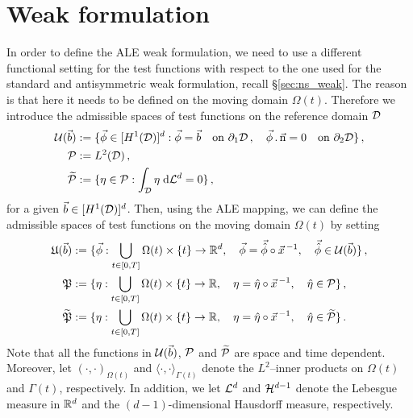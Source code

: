 \section{Weak formulation}\label{sec:ale_weak}
In order to define the ALE weak formulation, we need to use a different
functional setting for the test functions with respect to the one used for the
standard and antisymmetric weak formulation, recall \S\ref{sec:ns_weak}.
The reason is that here it
needs to be defined on the moving domain $\Omega(t)$. Therefore we introduce
the admissible spaces of test functions on the reference domain $\mathcal D$
\begin{align*}
\mathcal{U}(\vec{b}) &:= \{\vec \phi\in[H^1(\mathcal D)]^d:
\vec \phi =\vec b\quad \mbox{on }\partial_1\mathcal D\,,
\quad \vec \phi\,.\,\vec{\rm n}=0 \quad \mbox{on }\partial_2\mathcal D\}\,,\\
\mathcal{P} &:= L^2(\mathcal D)\,,\\
\widetilde{\mathcal{P}} &:= \{\eta\in\mathcal{P} : \int_\mathcal D\eta\;{\rm d}{\cal L}^{d}=0 \}\,,
\end{align*}
for a given $\vec b \in [H^1(\mathcal D)]^d$. Then, using the ALE mapping, we can
define the admissible spaces of test functions on the moving domain $\Omega(t)$
by setting
\begin{align*}
\mathfrak{U}(\vec{b}) &:= \{ \vec\phi:
\bigcup_{t \in [0,T]} \Omega(t)\times \{t\} \to \mathbb R^d,\quad
\vec \phi=\vec{\hat\phi}\circ\vec x^{\,-1},\quad\vec{\hat\phi}
\in\mathcal{U}(\vec{b})\}\,,\\
\mathfrak{P} &:= \{ \eta:
\bigcup_{t \in [0,T]} \Omega(t)\times \{t\} \to \mathbb R,\quad
\eta=\hat\eta\circ\vec x^{\,-1},\quad\hat\eta\in\mathcal{P} \}\,,\\
\widetilde{\mathfrak{P}} &:= \{ \eta:
\bigcup_{t \in [0,T]} \Omega(t)\times \{t\} \to \mathbb R,\quad
\eta=\hat\eta\circ\vec x^{\,-1},\quad\hat\eta\in\widetilde{\mathcal{P}} \}\,.
\end{align*}
Note that all the functions in $\mathcal{U}(\vec{b})$, $\mathcal{P}$ and
$\widetilde{\mathcal{P}}$ are space and time dependent. Moreover, let
$(\cdot,\cdot)_{\Omega(t)}$ and $\langle \cdot, \cdot
\rangle_{\Gamma(t)}$ denote the $L^2$--inner products on $\Omega(t)$ and
$\Gamma(t)$, respectively. In addition, we let $\mathcal{L}^d$ and $\mathcal{H}^{d-1}$ denote the
Lebesgue measure in $\mathbb R^d$ and the $(d-1)$-dimensional Hausdorff measure,
respectively.

